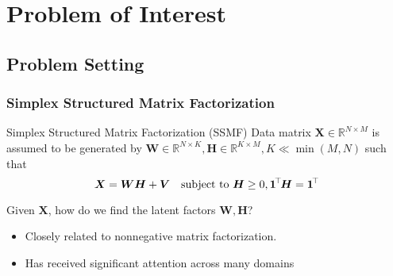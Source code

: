 \documentclass[10pt,xcolor={usenames,dvipsnames,table}]{beamer}
\def\blue{\color{blue}}
\newcommand{\T}{\!\top\!}
\newcommand{\citep}[1]{{\blue \scriptsize \parencite{#1}}}
\begin{document}
\section{Problem of Interest}%

\subsection{Problem Setting}%
\label{sub:separable_nmf}


\begin{frame}
    \frametitle{Simplex Structured Matrix Factorization}

    {
    \begin{block}{Simplex Structured Matrix Factorization (SSMF)}
    Data matrix $\bm{X} \in \mathbb{R}^{N \times M}$ is assumed to be generated by $\bm{W} \in \mathbb{R}^{N \times K}, \bm{H} \in \mathbb{R}^{K \times M}, K \ll \min(M, N)$  such that
    \[
    \bm{X} = \bm{W} \bm{H} + \bm{V} \quad \text{\rm subject to } \bm{H} \geq 0 , \bm{1}^{\T}\bm{H} = \bm{1}^{\T}
    \] 
    \end{block}}
    \begin{block}
        
    Given $\bm{X}$, how do we find the latent factors $\bm{W}, \bm{H}$?
    \end{block}
    \begin{itemize}
        \item Closely related to nonnegative matrix factorization.
            
\item Has received significant attention across many domains \citep{keshava2002spectral,CANMS,arora2012practical,arora2012learning,recht2012factoring,mao2017mixed,panov2018consistent,huang2019detecting,fu2016robust}
    \end{itemize}



\end{frame}
\end{document}
